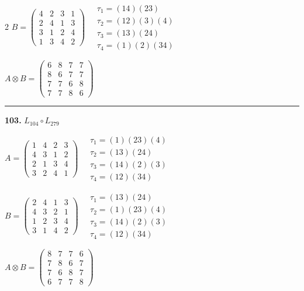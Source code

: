 \begin{multicols}{2}
$B = \begin{pmatrix} 4 & 2 & 3 & 1 \\ 2 & 4 & 1 & 3 \\ 3 & 1 & 2 & 4 \\ 1 & 3 & 4 & 2 \end{pmatrix} \quad \begin{matrix} \tau_{1}=(1 4)(2 3) \\ \tau_{2}=(1 2)(3)(4) \\ \tau_{3}=(1 3)(2 4) \\ \tau_{4}=(1)(2)(3 4) \end{matrix}$

$A \otimes B = \begin{pmatrix} 6 & 8 & 7 & 7 \\ 8 & 6 & 7 & 7 \\ 7 & 7 & 6 & 8 \\ 7 & 7 & 8 & 6 \end{pmatrix}$

\vspace{0.3em}
\hrule
\vspace{0.3em}

\noindent\textbf{103.} $L_{104} \circ L_{279}$

$A = \begin{pmatrix} 1 & 4 & 2 & 3 \\ 4 & 3 & 1 & 2 \\ 2 & 1 & 3 & 4 \\ 3 & 2 & 4 & 1 \end{pmatrix} \quad \begin{matrix} \tau_{1}=(1)(2 3)(4) \\ \tau_{2}=(1 3)(2 4) \\ \tau_{3}=(1 4)(2)(3) \\ \tau_{4}=(1 2)(3 4) \end{matrix}$

$B = \begin{pmatrix} 2 & 4 & 1 & 3 \\ 4 & 3 & 2 & 1 \\ 1 & 2 & 3 & 4 \\ 3 & 1 & 4 & 2 \end{pmatrix} \quad \begin{matrix} \tau_{1}=(1 3)(2 4) \\ \tau_{2}=(1)(2 3)(4) \\ \tau_{3}=(1 4)(2)(3) \\ \tau_{4}=(1 2)(3 4) \end{matrix}$

$A \otimes B = \begin{pmatrix} 8 & 7 & 7 & 6 \\ 7 & 8 & 6 & 7 \\ 7 & 6 & 8 & 7 \\ 6 & 7 & 7 & 8 \end{pmatrix}$


\end{multicols}
